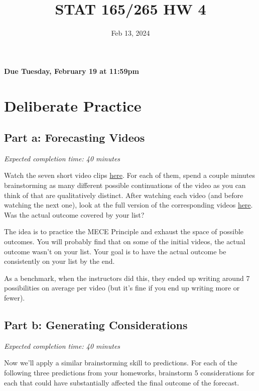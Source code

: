 \documentclass[11pt]{article}
\title{STAT 165/265 HW 4}
\date{Feb 13, 2024}
\begin{document}
\maketitle

\hfill \textbf{Due Tuesday, February 19 at 11:59pm}

\section*{Deliberate Practice}

\subsection*{Part a: Forecasting Videos}

\emph{Expected completion time: 40 minutes}

Watch the seven short video clips \href{http://www.forecastingclass.com/assets/initial_clips.zip}{here}. For each of them, spend a couple minutes brainstorming as many different 
possible continuations of the video as you can think of that are qualitatively distinct. After watching each video (and before watching the next one), look at the 
full version of the corresponding videos \href{http://www.forecastingclass.com/assets/full_videos.zip}{here}. Was the actual outcome covered by your list?

The idea is to practice the MECE Principle and exhaust the space of possible outcomes. You will probably find that on some of the initial videos, the actual outcome wasn't on your list. 
Your goal is to have the actual outcome be consistently on your list by the end.

As a benchmark, when the instructors did this, they ended up writing around 7 possibilities on average per video (but it's fine if you end up writing more or fewer).


\subsection*{Part b: Generating Considerations}

\emph{Expected completion time: 40 minutes}

Now we'll apply a similar brainstorming skill to predictions. 
For each of the following three predictions from your homeworks, brainstorm 5 considerations for each that could have substantially affected the final outcome of the forecast.
\end{document}
